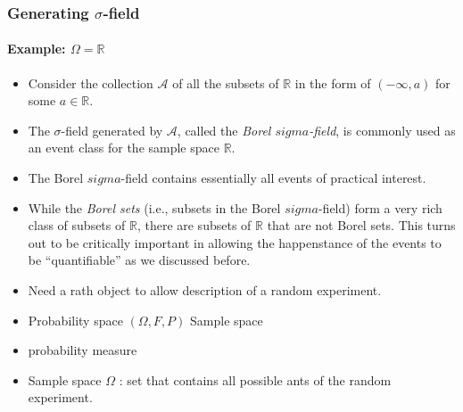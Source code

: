 \subsubsection{Generating \(\sigma\)-field}

\paragraph{Example: \(\Omega=\mathbb{R}\)}
\begin{itemize}
\item Consider the collection \(\mathcal{A}\) of all the subsets of
  \(\mathbb{R}\) in the form of \((-\infty, a)\) for some
  \(a \in \mathbb{R}\).
\item The \(\sigma\)-field generated by \(\mathcal{A}\), called the
  \emph{Borel \(sigma\)-field}, is commonly used as an event class for
  the sample space \(\mathbb{R}\).
\item The Borel \(sigma\)-field contains essentially all events of
  practical interest.
\item While the \emph{Borel sets} (i.e., subsets in
  the Borel \(sigma\)-field) form a very rich class of subsets  of
  \(\mathbb{R}\), there are subsets of \(\mathbb{R}\) that are not
  Borel sets. This turns out to be critically important in allowing the
  happenstance of the events to be ``quantifiable'' as we discussed
  before.
\end{itemize}




\begin{itemize}
  \item[-] Need a rath object to allow description of a random experiment.
  \item[-] Probability space \((\Omega, F, P)\) Sample space
  \item[] probability measure
  \item[-] Sample space \(\Omega\) : set that contains all possible ants of the random experiment.
\end{itemize}
